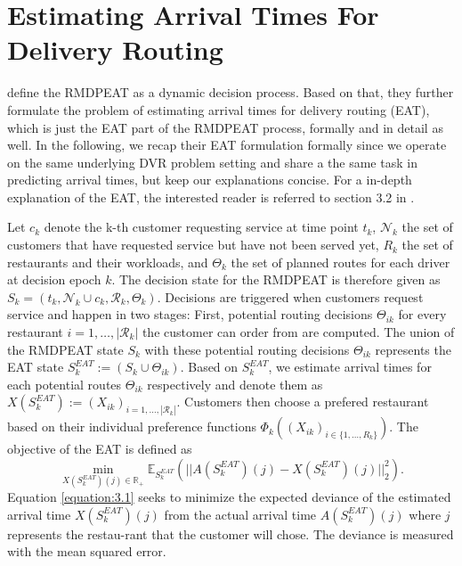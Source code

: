 \section{Estimating Arrival Times For Delivery Routing}

\cite{Hildebrandt2020_EAT} define the RMDPEAT as a dynamic decision process. Based on that, they further formulate the problem of estimating arrival times for delivery routing (EAT), which is just the EAT part of the RMDPEAT process, formally and in detail as well. In the following, we recap their EAT formulation formally since we operate on the same underlying DVR problem setting and share a the same task in predicting arrival times, but keep our explanations concise. For a in-depth explanation of the EAT, the interested reader is referred to section 3.2 in \cite{Hildebrandt2020_EAT}. 

Let $ c_k $ denote the k-th customer requesting service at time point $ t_k $, $ \mathcal{N}_k $ the set of customers that have requested service but have not been served yet, $ R_k $ the set of restaurants and their workloads, and $ \Theta_k $ the set of planned routes for each driver at decision epoch $ k $. The decision state for the RMDPEAT is therefore given as $ S_k = (t_k, \mathcal{N}_k \cup c_k, \mathcal{R}_k, \Theta_k) $. Decisions are triggered when customers request service and happen in two stages: First, potential routing decisions $ \Theta_{ik} $ for every restaurant $ i = 1, \dots, |\mathcal{R}_k| $ the customer can order from are computed. The union of the RMDPEAT state $ S_k $ with these potential routing decisions $ \Theta_{ik} $ represents the EAT state $ S^{EAT}_k := (S_k \cup \Theta_{ik})$. Based on $ S^{EAT}_k $, we estimate arrival times for each potential routes $ \Theta_{ik} $ respectively and denote them as $ X(S^{EAT}_k) := (X_{ik})_{i = 1, \dots, |\mathcal{R}_k|}$. Customers then choose a prefered restaurant based on their individual preference functions $ \Phi_k((X_{ik})_{i \in \{1,\dots, R_k\}}) $.  
The objective of the EAT is defined as
\begin{equation}\label{equation:3.1}
	\min_{X(S^{EAT}_k)(j) \in \mathbb{R}_+} 
	\mathbb{E}_{S^{EAT}_{k}} 
	(|| A(S^{EAT}_{k})(j) - X(S^{EAT}_{k})(j)||^{2}_{2}).
\end{equation}
Equation \ref{equation:3.1} seeks to minimize the expected deviance of the estimated arrival time $ X(S^{EAT}_{k})(j) $ from the actual arrival time $ A(S^{EAT}_{k})(j) $ where $ j $ represents the restau-rant that the customer will chose. The deviance is measured with the mean squared error.


    